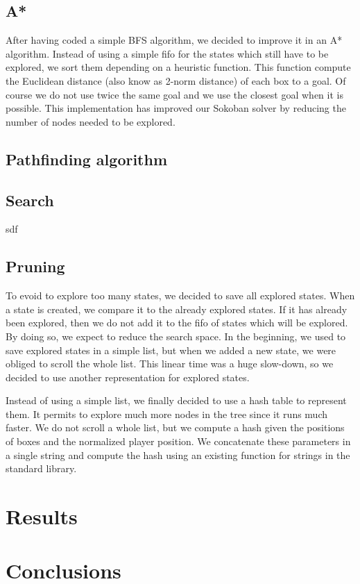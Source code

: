 \documentclass[a4paper,10pt]{article}
\begin{document}
            
	
	\subsection{A*}
	After having coded a simple BFS algorithm, we decided to improve it in an A* algorithm. 
	Instead of using a simple fifo for the states which still have to be explored, we sort them depending on a heuristic function. 
	This function compute the Euclidean distance (also know as 2-norm distance) of each  box to a goal. 
	Of course we do not use twice the same goal and we use the closest goal when it is possible. 
	This implementation has improved our Sokoban solver by reducing the number of nodes needed to be explored.

	\subsection{Pathfinding algorithm}

    \subsection{Search}
        sdf~\cite{solving_soko}
    \subsection{Pruning}
    To evoid to explore too many states, we decided to save all explored states. 
    When a state is created, we compare it to the already explored states. 
    If it has already been explored, then we do not add it to the fifo of states which will be explored. 
    By doing so, we expect to reduce the search space. 
    In the beginning, we used to save explored states in a simple list, but when we added a new state, we were obliged to scroll the whole list. 
    This linear time was a huge slow-down, so we decided to use another representation for explored states.
    
    Instead of using a simple list, we finally decided to use a hash table to represent them. 
    It permits to explore much more nodes in the tree since it runs much faster. 
    We do not scroll a whole list, but we compute a hash given the positions of boxes and the normalized player position. 
    We concatenate these parameters in a single string and compute the hash using an existing function for strings in the standard library.


\section{Results}

\section{Conclusions}
   
      
 
 
	
\end{document}
